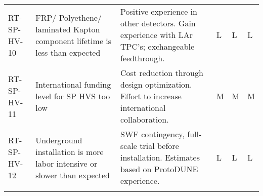 \begin{footnotesize}
\begin{longtable}{x{0.18\textwidth}x{0.20\textwidth}x{0.32\textwidth}x{0.02\textwidth}x{0.02\textwidth}x{0.02\textwidth}}
RT-SP-HV-10 & FRP/ Polyethene/ laminated Kapton component lifetime is less than expected & Positive experience in other detectors. Gain experience with LAr TPC's; exchangeable feedthrough. & L & L & L \\  \colhline
RT-SP-HV-11 & International funding level for SP HVS too low & Cost reduction through design optimization. Effort to increase international collaboration. & M & M & M \\  \colhline
RT-SP-HV-12 & Underground installation is more labor intensive or slower than expected & SWF contingency, full-scale trial before installation. Estimates based on ProtoDUNE experience. & L & L & L \\  \colhline

\label{tab:risks:SP-FD-HV}
\end{longtable}
\end{footnotesize}